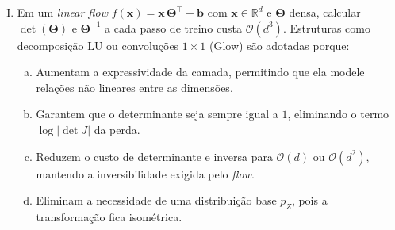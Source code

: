 \documentclass{dlproblemset}
\begin{document}
\begin{enumerate}[I)]
    \item Em um \textit{linear flow} $f(\mathbf{x}) = \mathbf{x}\,\mathbf{\Theta}^{\top} + \mathbf{b}$ com $\mathbf{x} \in \mathbb{R}^d$ e $\mathbf{\Theta}$ densa, calcular $\det(\mathbf{\Theta})$ e $\mathbf{\Theta}^{-1}$ a cada passo de treino custa $\mathcal{O}(d^3)$. Estruturas como decomposição LU ou convoluções $1{\times}1$ (Glow) são adotadas porque:
    \begin{enumerate}[(a)]
        \item Aumentam a expressividade da camada, permitindo que ela modele relações não lineares entre as dimensões.
        \item Garantem que o determinante seja sempre igual a $1$, eliminando o termo $\log|\det J|$ da perda.
        \item Reduzem o custo de determinante e inversa para $\mathcal{O}(d)$ ou $\mathcal{O}(d^2)$, mantendo a inversibilidade exigida pelo \textit{flow}.
        \item Eliminam a necessidade de uma distribuição base $p_Z$, pois a transformação fica isométrica.
    \end{enumerate}



\end{enumerate}
\end{document}
